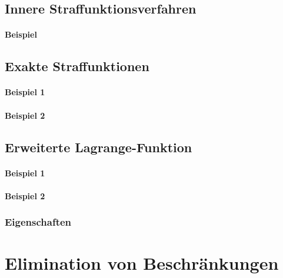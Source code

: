 		\subsection{Innere Straffunktionsverfahren} %

			\paragraph{Beispiel} %

		\subsection{Exakte Straffunktionen} %

			\paragraph{Beispiel 1} %

			\paragraph{Beispiel 2} %

		\subsection{Erweiterte Lagrange-Funktion} %

			\paragraph{Beispiel 1} %

			\paragraph{Beispiel 2} %

			\subsubsection{Eigenschaften} %

	\section{Elimination von Beschränkungen} %


